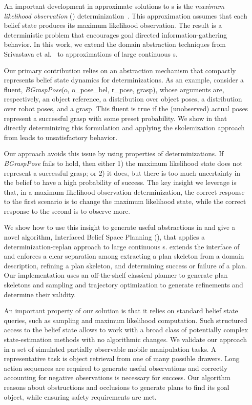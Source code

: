 An important development in approximate solutions to \pomdp s is the
\emph{maximum likelihood observation} (\mld)
determinization~\cite{platt2010belief}. This approximation assumes
that each belief state produces its maximum likelihood
observation. The result is a deterministic problem that encourages
goal directed information-gathering behavior. In this work, we extend
the domain abstraction techniques from Srivastava et
al.~\cite{srivastava2014combined} to \mld{} approximations of large
continuous \pomdp s.

Our primary contribution relies on an abstraction mechanism that
compactly represents belief state dynamics for \mld{}
determinizations. As an example, consider a fluent,
\emph{BGraspPose}(o, o\_pose\_bel, r\_pose, grasp), whose arguments
are, respectively, an object reference, a distribution over object
poses, a distribution over robot poses, and a grasp. This fluent is
true if the (unobserved) actual poses represent a successful grasp
with some preset probability. We show in 
that directly determinizing this formulation and applying the
skolemization approach from \cite{srivastava2014combined} leads to
unsatisfactory behavior.

Our approach avoids this issue by using properties of \mld{}
determinizations. If \emph{BGraspPose} fails to hold, then either 1)
the maximum likelihood state does not represent a successful grasp; or
2) it does, but there is too much uncertainty in the belief to have a
high probability of success. The key insight we leverage is that, in a
maximum likelihood observation determinization, the correct response
to the first scenario is to change the maximum likelihood state, while
the correct response to the second is to observe more.

We show how to use this insight to generate useful abstractions in
 and give a novel algorithm, Interfaced Belief
Space Planning (\ibsp), that applies a determinization-replan approach
to large continuous \pomdp s. \ibsp{} extends the interface of
\cite{srivastava2014combined} and enforces a clear separation among
extracting a plan skeleton from a domain description, refining a plan
skeleton, and determining success or failure of a plan. Our
implementation uses an off-the-shelf classical planner to generate
plan skeletons and sampling and trajectory optimization to generate
refinements and determine their validity.

An important property of our solution is that it relies on standard
belief state queries, such as sampling and maximum likelihood
computation. Such structured access to the belief state allows \ibsp{}
to work with a broad class of potentially complex state-estimation
methods with no algorithmic changes. We validate our approach in a set
of simulated partially observable mobile manipulation tasks. A
representative task is object retrieval from one of many possible
drawers. Long action sequences are required to generate useful
observations and correctly accounting for negative observations is
necessary for success. Our algorithm reasons about
obstructions and occlusions to generate plans to find its goal object,
while ensuring safety requirements are met.

